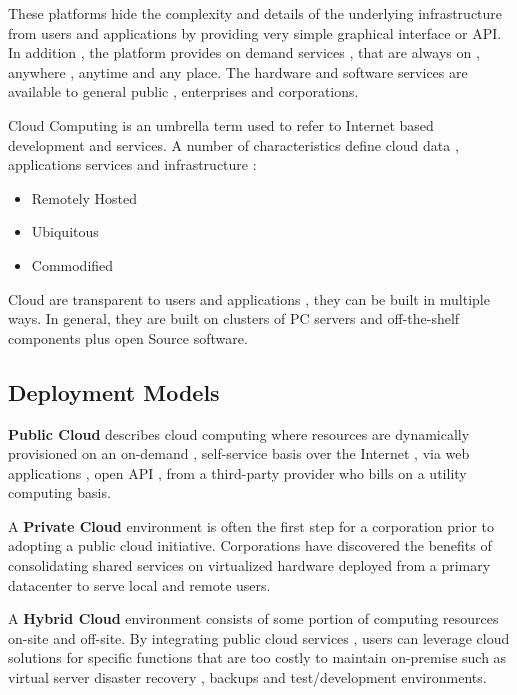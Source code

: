 \documentclass{article}
\begin{document}
These platforms hide the complexity and details of the underlying infrastructure from users and applications by providing very simple graphical interface or API.
In addition , the platform provides on demand services , that are always on , anywhere , anytime and any place.
The hardware and software services are available to general public , enterprises and corporations.

Cloud Computing is an umbrella term used to refer to Internet based development and services.
A number of characteristics define cloud data , applications services and infrastructure : \begin{itemize}
    \item Remotely Hosted 
    \item Ubiquitous 
    \item Commodified 
\end{itemize}


Cloud are transparent to users and applications , they can be built in multiple ways.
In general, they are built on clusters of PC servers and off-the-shelf components plus open Source software.


\subsection{Deployment Models}

\textbf{Public Cloud} describes cloud computing where resources are dynamically provisioned on an on-demand , self-service basis over the Internet , via web applications , open API , from a third-party provider who bills on a utility computing basis.

A \textbf{Private Cloud} environment is often the first step for a corporation prior to adopting a public cloud initiative.
Corporations have discovered the benefits of consolidating shared services on virtualized hardware deployed from a primary datacenter to serve local and remote users.

A \textbf{Hybrid Cloud} environment consists of some portion of computing resources on-site and off-site.
By integrating public cloud services , users can leverage cloud solutions for specific functions that are too costly to maintain on-premise such as virtual server disaster recovery , backups and test/development environments.
\end{document}
